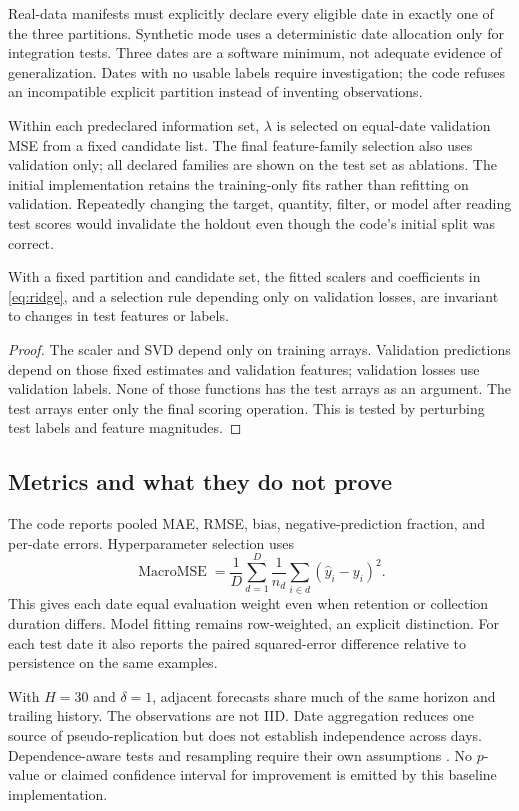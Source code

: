 Real-data manifests must explicitly declare every eligible date in exactly one of the three partitions. Synthetic mode uses a deterministic date allocation only for integration tests. Three dates are a software minimum, not adequate evidence of generalization. Dates with no usable labels require investigation; the code refuses an incompatible explicit partition instead of inventing observations.

Within each predeclared information set, $\lambda$ is selected on equal-date validation MSE from a fixed candidate list. The final feature-family selection also uses validation only; all declared families are shown on the test set as ablations. The initial implementation retains the training-only fits rather than refitting on validation. Repeatedly changing the target, quantity, filter, or model after reading test scores would invalidate the holdout even though the code's initial split was correct.

\begin{proposition}
With a fixed partition and candidate set, the fitted scalers and coefficients in \eqref{eq:ridge}, and a selection rule depending only on validation losses, are invariant to changes in test features or labels.
\end{proposition}
\begin{proof}
The scaler and SVD depend only on training arrays. Validation predictions depend on those fixed estimates and validation features; validation losses use validation labels. None of those functions has the test arrays as an argument. The test arrays enter only the final scoring operation. This is tested by perturbing test labels and feature magnitudes.
\end{proof}

\subsection{Metrics and what they do not prove}
The code reports pooled MAE, RMSE, bias, negative-prediction fraction, and per-date errors. Hyperparameter selection uses
\[
 \operatorname{MacroMSE}=\frac1D\sum_{d=1}^{D}\frac1{n_d}\sum_{i\in d}(\widehat y_i-y_i)^2.
\]
This gives each date equal evaluation weight even when retention or collection duration differs. Model fitting remains row-weighted, an explicit distinction. For each test date it also reports the paired squared-error difference relative to persistence on the same examples.

With $H=30$ and $\delta=1$, adjacent forecasts share much of the same horizon and trailing history. The observations are not IID. Date aggregation reduces one source of pseudo-replication but does not establish independence across days. Dependence-aware tests and resampling require their own assumptions \citep{diebold1995,politis1994}. No $p$-value or claimed confidence interval for improvement is emitted by this baseline implementation.

